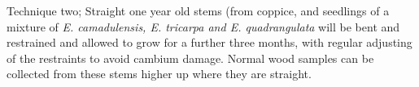 Technique two; Straight one year old stems (from coppice, and seedlings of a
mixture of \textit{E. camadulensis, E. tricarpa and E. quadrangulata} will be bent and restrained
and allowed to grow for a further three months, with regular adjusting of the
restraints to avoid cambium damage. Normal wood samples can be collected from
these stems higher up where they are straight.
